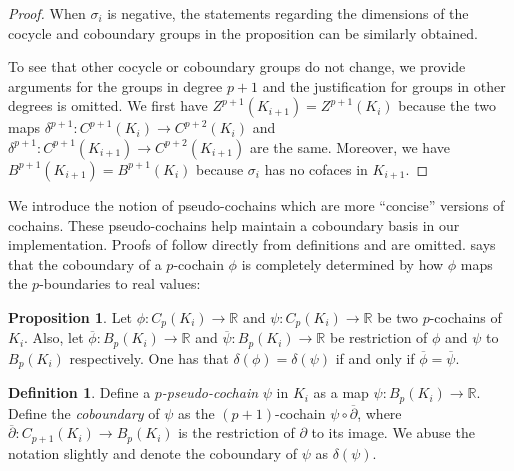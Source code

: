 \documentclass[10pt,a4paper]{amsart}
\newcommand{\para}[1]{\vspace{2mm}\noindent{\textbf{\sffamily{#1}}}\hspace{4pt}}
\theoremstyle{definition}
\newcommand{\red}{\color{red}}
\newcommand{\fsimp}{\sigma}
\newcommand{\Hm}{H}
\newcommand{\Chn}{C}
\newcommand{\Zyc}{Z}
\newcommand{\Bnd}{B}
\newcommand{\Real}{\mathbb{R}}
\newcommand{\sG}{\sigma}
\newcommand{\dG}{\delta}
\let\bar\overline
\newtheorem{definition}[theorem]{Definition}
\newtheorem{proposition}[theorem]{Proposition}
\theoremstyle{remark}
\begin{document}
\begin{proof}
When $\fsimp_i$ is negative,
the statements regarding the dimensions of the 
cocycle and coboundary groups 
in the proposition
can be similarly obtained.

To see that other cocycle or coboundary groups do not change, 
we provide arguments for the groups in degree $p+1$ 
and the justification for groups in other degrees is omitted.
We first have $\Zyc^{p+1}(K_{i+1})=\Zyc^{p+1}(K_{i})$
because the two 
maps $\dG^{p+1}: \Chn^{p+1}(K_i)\to \Chn^{p+2}(K_i)$ and
$\dG^{p+1}: \Chn^{p+1}(K_{i+1})\to \Chn^{p+2}(K_{i+1})$ are the same.
Moreover, 
we have $\Bnd^{p+1}(K_{i+1})=\Bnd^{p+1}(K_{i})$
because $\sG_i$ has no cofaces in $K_{i+1}$.
\end{proof}


\newcommand{\ldim}{{p}}
\para{Pseudo-cochains.}
We introduce the notion of {pseudo-cochains}
which are more ``concise'' versions
of  cochains.
These
pseudo-cochains help maintain a coboundary basis
in our implementation.
Proofs of 
follow directly from
definitions
and are omitted.
says that 
the coboundary of a $\ldim$-cochain $\phi$
is completely determined by how $\phi$ maps the $\ldim$-boundaries 
to  real values:
\begin{proposition}\label{prop:cobound-by-bound}
Let
$\phi:\Chn_\ldim(K_i)\to\Real$ 
and $\psi:\Chn_\ldim(K_i)\to\Real$ be two $\ldim$-cochains  of $K_i$.
Also,
let $\bar{\phi}:\Bnd_\ldim(K_i)\to\Real$ and $\bar{\psi}:\Bnd_\ldim(K_i)\to\Real$ be restriction of $\phi$ 
and $\psi$
to $\Bnd_\ldim(K_i)$ respectively.
One has that  $\dG(\phi)=\dG(\psi)$
if and only if $\bar{\phi}=\bar{\psi}$.
\end{proposition}


\begin{definition}
Define a \emph{$\ldim$-pseudo-cochain} $\psi$ in $K_i$ as 
a map $\psi:\Bnd_\ldim(K_i)\to\Real$.
Define the \emph{coboundary} of $\psi$
as the $(\ldim+1)$-cochain $\psi\circ\bar{\partial}$,
where $\bar{\partial}:\Chn_{\ldim+1}(K_i)\to\Bnd_\ldim(K_i)$
is the restriction of $\partial$ to its image.
We abuse the notation slightly and denote 
the coboundary of $\psi$ as $\dG(\psi)$.
\end{definition}
\end{document}
